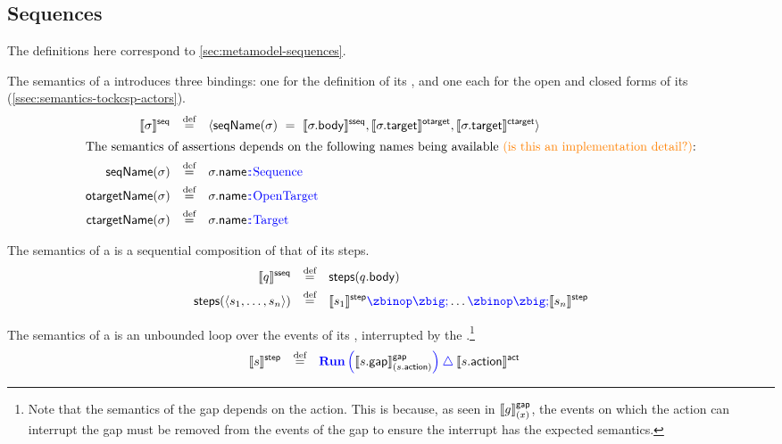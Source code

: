 \subsection{Sequences}\label{ssec:semantics-tockcsp-sequences}

The definitions here correspond to \cref{sec:metamodel-sequences}.

\begin{defn}[\msequence]

The semantics of a \msequence{} introduces three bindings: one for the
definition of its \msubsequence, and one each for the open and closed forms of
its \mtarget{} (\cref{ssec:semantics-tockcsp-actors}).
%
\begin{align*}
	\seqsema{\aseq}
\quad\defeq\quad&	
\langle
	\seqnameOf{\aseq}\ =\ \sseqsema{\field{\aseq}{body}}
	, \otargetsema{\field{\aseq}{target}}
	, \ctargetsema{\field{\aseq}{target}}\rangle
\\
\intertext{The semantics of assertions depends on the following names being
available \todo{is this an implementation detail?}:}
	\seqnameOf{\aseq}
\quad\defeq\quad&
	\field{\aseq}{name} \tlang{{} \cspnsop \text{Sequence}}
\\
	\otargetnameOf{\aseq}
\quad\defeq\quad&
	\field{\aseq}{name} \tlang{{} \cspnsop \text{OpenTarget}}
\\
	\ctargetnameOf{\aseq}
\quad\defeq\quad&
	\field{\aseq}{name} \tlang{{} \cspnsop \text{Target}}
\end{align*}

\end{defn}

\begin{defn}[\msubsequence]

The semantics of a \msubsequence{} is a sequential composition of that of its steps.
%
\begin{align*}
	\sseqsema{\asseq}
	\quad\defeq\quad&	
	\funcname{steps}(\field{\asseq}{body})
\\
	\funcname{steps}(\langle \astep_1, \dotsc, \astep_n \rangle)
	\quad\defeq\quad&	
	\stepsema{\astep_1} \tlang{\circseq} \dotso \tlang{\circseq} \stepsema{\astep_n}
\end{align*}

\end{defn}

\begin{defn}[\msequencestep]

The semantics of a \msequencestep{} is an unbounded loop over the events of its
\msequencegap, interrupted by the \msequenceaction.\footnote{Note that the semantics of the gap depends
on the action.  This is because, as seen in \(\llbracket g \rrbracket^{\mathsf{gap}}_{(x)}\),
the events on which the action can interrupt the
gap must be removed from the events of the gap to ensure the interrupt has the
expected semantics.}
%
\begin{align*}
	\llbracket s \rrbracket^{\mathsf{step}}
\quad\mathbin{\overset{\text{def}}=}\quad&	
	\textcolor{blue}{
		\operatorname{\mathbf{Run}}\left(\textcolor{black}{\llbracket s.\mathsf{gap} \rrbracket^{\mathsf{gap}}_{(s.\mathsf{action})}}\right)
		\mathbin{\triangle} \textcolor{black}{\llbracket s.\mathsf{action} \rrbracket^{\mathsf{act}}}
	}
\end{align*}
\end{defn}

